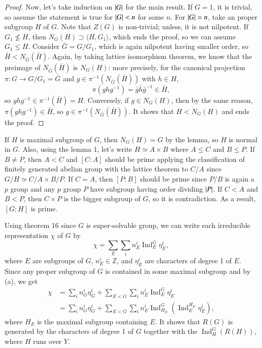 \documentclass[a4paper, 12pt]{article}
\theoremstyle{Mydefinition}
\theoremstyle{Mytheorem}
\DeclareMathOperator{\Ind}{Ind}
\begin{document}
\begin{enumerate}
\begin{proof}
    Now, let's take induction on $\abs{G}$ for the main result. If $G=1$, it is trivial, so assume the statement is true for $\abs{G}<n$ for some $n$. For $\abs{G}=n$, take an proper subgroup $H$ of $G$. Note that $Z(G)$ is non-trivial; unless, it is not nilpotent. If $G_1\not\leq H$, then $N_G(H)\supset \langle H, G_1\rangle$, which ends the proof, so we can assume $G_1\leq H$. Consider $\bar{G} = G/G_1$, which is again nilpotent having smaller order, so $\bar{H}<N_{\bar{G}}(\bar{H})$. Again, by taking lattice isomorphism theorem, we know that the preimage of $N_{\bar{G}}(\bar{H})$ is $N_G(H)$: more precisely, for the canonical projection $\pi:G\rightarrow G/G_1=\bar{G}$ and $g\in \pi^{-1}\left(N_{\bar{G}}(\bar{H})\right)$ with $h\in H$,
    \begin{equation}
        \pi(ghg^{-1}) = \bar{g}\bar{h}\bar{g}^{-1}\in \bar{H},
    \end{equation}
    so $ghg^{-1}\in \pi^{-1}(\bar{H}) = H$. Conversely, if $g\in N_G(H)$, then by the same reason, $\pi(ghg^{-1})\in \bar{H}$, so $g\in \pi^{-1}\left(N_{\bar{G}}(\bar{H})\right)$. It shows that $H<N_G(H)$ and ends the proof.
    \end{proof}
    If $H$ is maximal subgroup of $G$, then $N_G(H)=G$ by the lemma, so $H$ is normal in $G$. Also, using the lemma 1, let's write $H\simeq A\times B$ where $A\leq C$ and $B\leq P$. If $B\neq P$, then $A<C$ and $[C:A]$ should be prime applying the classification of finitely generated abelian group with the lattice theorem to $C/A$ since $G/H\simeq C/A\times B/P$. If $C=A$, then $[P:B]$ should be prime since $P/B$ is again a $p$ group and any $p$ group $P$ have subgroup having order dividing $\abs{P}$. If $C<A$ and $B<P$, then $C\times P$ is the bigger subgroup of $G$, so it is contradiction. As a result, $[G:H]$ is prime.
    
    Using theorem 16 since $G$ is super-solvable group, we can write each irreducible representation $\chi$ of $G$ by
    \begin{equation}
        \chi = \sum_{E}\sum_i n_E^i\Ind_E^G \eta^i_E,
    \end{equation}
    where $E$ are subgroups of $G$, $n_E^i\in\mathbb{Z}$, and $\eta^i_E$ are characters of degree 1 of $E$. Since any proper subgroup of $G$ is contained in some maximal subgroup and by (a), we get
    \begin{equation}
    \begin{split}
        \chi &= \sum_i n_G^i \eta^i_G +  \sum_{E<G}\sum_i n_E^i\Ind_E^G \eta^i_E \\
        &=\sum_i n_G^i \eta^i_G + \sum_{E<G}\sum_i n_E^i\Ind_{H_E}^G\left(\Ind_{E}^{H_E} \eta^i_E\right),
    \end{split}
    \end{equation}
    where $H_E$ is the maximal subgroup containing $E$. It shows that $R(G)$ is generated by the characters of degree 1 of $G$ together with the $\Ind_H^G(R(H))$, where $H$ runs over $Y$.
    

\end{enumerate}
\end{document}
